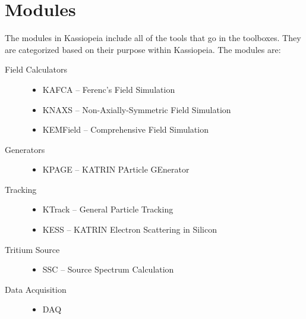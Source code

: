 \chapter{Modules}\label{sec:modules}\label{ch:modules}

The modules in Kassiopeia include all of the tools that go in the toolboxes.  They are categorized based on their purpose within Kassiopeia.  The modules are:

\flushleft
\begin{description}
\item[Field Calculators]\quad
	\begin{itemize}
	\item KAFCA -- Ferenc's Field Simulation
	\item KNAXS -- Non-Axially-Symmetric Field Simulation
	\item KEMField -- Comprehensive Field Simulation
	\end{itemize}
\item[Generators]\quad
	\begin{itemize}
	\item KPAGE -- KATRIN PArticle GEnerator
	\end{itemize}
\item[Tracking]\quad
	\begin{itemize}
	\item KTrack -- General Particle Tracking
	\item KESS -- KATRIN Electron Scattering in Silicon
	\end{itemize}
\item[Tritium Source]\quad
	\begin{itemize}
	\item{SSC} -- Source Spectrum Calculation
	\end{itemize}
\item[Data Acquisition]\quad
	\begin{itemize}
	\item{DAQ}
	\end{itemize}
\end{description}

